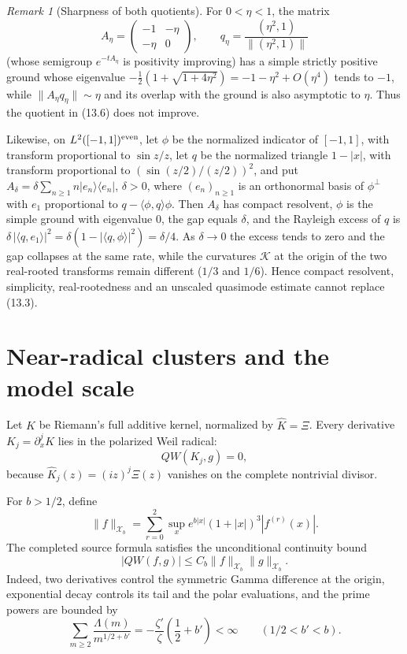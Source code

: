 \documentclass[11pt]{amsart}
\theoremstyle{definition}
\theoremstyle{remark}
\newtheorem{remark}[theorem]{Remark}
\newcommand{\XiR}{\Xi}
\begin{document}
\begin{remark}[Sharpness of both quotients]
For \(0<\eta<1\), the matrix
\[
 A_\eta=\begin{pmatrix}-1&-\eta\\-\eta&0\end{pmatrix},
 \qquad q_\eta=\frac{(\eta^2,1)}{\|(\eta^2,1)\|}
\]
(whose semigroup \(e^{-tA_\eta}\) is positivity improving) has a simple
strictly positive ground whose eigenvalue
\(-\tfrac12(1+\sqrt{1+4\eta^2})=-1-\eta^2+O(\eta^4)\) tends to \(-1\),
while \(\|A_\eta q_\eta\|\sim\eta\) and its overlap with the ground is also
asymptotic to \(\eta\).  Thus the quotient in (13.6) does not improve.

Likewise, on \(L^2([-1,1])^{\rm even}\), let \(\phi\) be the normalized
indicator of \([-1,1]\), with transform proportional to \(\sin z/z\), let
\(q\) be the normalized triangle \(1-|x|\), with transform proportional to
\((\sin(z/2)/(z/2))^2\), and put
\(A_\delta=\delta\sum_{n\ge1}n|e_n\rangle\langle e_n|\), \(\delta>0\), where
\((e_n)_{n\ge1}\) is an orthonormal basis of \(\phi^\perp\) with \(e_1\)
proportional to \(q-\langle\phi,q\rangle\phi\).  Then \(A_\delta\) has compact
resolvent,
\(\phi\) is the simple ground with eigenvalue \(0\), the gap equals
\(\delta\), and the Rayleigh excess of \(q\) is
\(\delta\,|\langle q,e_1\rangle|^2=\delta(1-|\langle q,\phi\rangle|^2)=\delta/4\).  As \(\delta\to0\) the
excess tends to zero and the gap collapses at the same rate, while the
curvatures \(\mathcal K\) at the origin of the two real-rooted transforms
remain different (\(1/3\) and \(1/6\)).  Hence
compact resolvent, simplicity, real-rootedness and an unscaled quasimode
estimate cannot replace (13.3).
\end{remark}

\section{Near-radical clusters and the model scale}
\label{sec:cluster}

Let \(K\) be Riemann's full additive kernel, normalized by
\(\widehat K=\XiR\).  Every derivative \(K_j=\partial_x^jK\) lies in the
polarized Weil radical:
\[
 QW(K_j,g)=0,
 \tag{14.1}
\]
because \(\widehat K_j(z)=(iz)^j\XiR(z)\) vanishes on the complete
nontrivial divisor.

For \(b>1/2\), define
\[
 \|f\|_{\mathcal X_b}
 =\sum_{r=0}^2\sup_x
 e^{b|x|}(1+|x|)^3|f^{(r)}(x)|.
\]
The completed source formula satisfies the unconditional continuity bound
\[
 \boxed{|QW(f,g)|\le C_b\|f\|_{\mathcal X_b}\|g\|_{\mathcal X_b}.}
 \tag{14.2}
\]
Indeed, two derivatives control the symmetric Gamma difference at the
origin, exponential decay controls its tail and the polar evaluations, and
the prime powers are bounded by
\[
 \sum_{m\ge2}\frac{\Lambda(m)}{m^{1/2+b'}}
 =-\frac{\zeta'}\zeta\left(\frac12+b'\right)<\infty
 \qquad(1/2<b'<b).
\]
\end{document}
